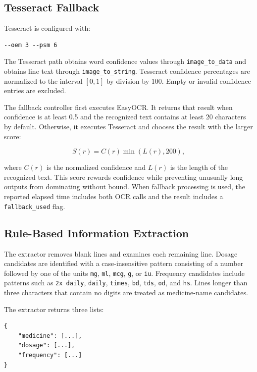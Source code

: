 \documentclass[conference]{IEEEtran}
\begin{document}
\subsection{Tesseract Fallback}
\label{sec:tesseract}

Tesseract is configured with:

\begin{verbatim}
--oem 3 --psm 6
\end{verbatim}

The Tesseract path obtains word confidence values through
\texttt{image\_to\_data} and obtains line text through
\texttt{image\_to\_string}. Tesseract confidence percentages are normalized to
the interval $[0,1]$ by division by 100. Empty or invalid confidence entries
are excluded.

The fallback controller first executes EasyOCR. It returns that result when
confidence is at least 0.5 and the recognized text contains at least 20
characters by default. Otherwise, it executes Tesseract and chooses the result
with the larger score:

\begin{equation}
S(r) = C(r)\min(L(r), 200),
\label{eq:fallback}
\end{equation}

where $C(r)$ is the normalized confidence and $L(r)$ is the length of the
recognized text. This score rewards confidence while preventing unusually long
outputs from dominating without bound. When fallback processing is used, the
reported elapsed time includes both OCR calls and the result includes a
\texttt{fallback\_used} flag.

\subsection{Rule-Based Information Extraction}
\label{sec:extraction}

The extractor removes blank lines and examines each remaining line. Dosage
candidates are identified with a case-insensitive pattern consisting of a
number followed by one of the units \texttt{mg}, \texttt{ml}, \texttt{mcg},
\texttt{g}, or \texttt{iu}. Frequency candidates include patterns such as
\texttt{2x daily}, \texttt{daily}, \texttt{times}, \texttt{bd}, \texttt{tds},
\texttt{od}, and \texttt{hs}. Lines longer than three characters that contain no
digits are treated as medicine-name candidates.

The extractor returns three lists:

\begin{verbatim}
{
    "medicine": [...],
    "dosage": [...],
    "frequency": [...]
}
\end{verbatim}
\end{document}
